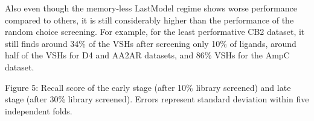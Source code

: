 Also even though the memory-less LastModel regime shows worse performance compared to others, it is still considerably higher than the performance of the random choice screening. For example, for the least performative CB2 dataset, it still finds around 34\% of the VSHs after screening only 10\% of ligands, around half of the VSHs for D4 and AA2AR datasets, and 86\% VSHs for the AmpC dataset.

\begin{table}[!ht]
    \centering
    \begin{adjustbox}{angle=90}
        \resizebox{1.2\textwidth}{!}
        {
            
        }
    \end{adjustbox}
    \caption{Figure 5: Recall score of the early stage (after 10\% library screened) and late stage (after 30\% library screened). Errors represent standard deviation within five independent folds.}
    \label{tab:tab_1_activelearning}
\end{table}